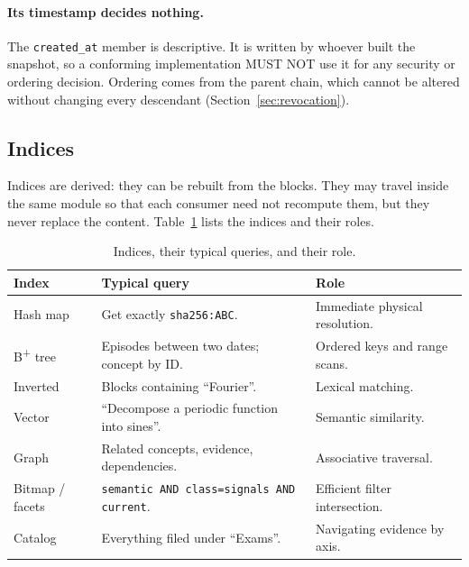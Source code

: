 \documentclass[11pt,a4paper]{article}
\begin{document}
\paragraph{Its timestamp decides nothing.}
The \texttt{created\_at} member is descriptive. It is written by whoever built
the snapshot, so a conforming implementation MUST NOT use it for any security or
ordering decision. Ordering comes from the parent chain, which cannot be altered
without changing every descendant (Section~\ref{sec:revocation}).

\subsection{Indices}
\label{sec:indices-derived}

Indices are derived: they can be rebuilt from the blocks. They may travel
inside the same module so that each consumer need not recompute them, but they
never replace the content. Table~\ref{tab:indices} lists the indices and their
roles.

\begin{table}[htbp]
\centering
\caption{Indices, their typical queries, and their role.}
\label{tab:indices}
\begin{tabularx}{\textwidth}{lXl}
\toprule
\textbf{Index} & \textbf{Typical query} & \textbf{Role} \\
\midrule
Hash map                   & Get exactly \texttt{sha256:ABC}.               & Immediate physical resolution. \\
B\textsuperscript{+} tree  & Episodes between two dates; concept by ID.     & Ordered keys and range scans. \\
Inverted                   & Blocks containing ``Fourier''.                 & Lexical matching. \\
Vector                     & ``Decompose a periodic function into sines''.  & Semantic similarity. \\
Graph                      & Related concepts, evidence, dependencies.      & Associative traversal. \\
Bitmap / facets & \texttt{semantic AND class=signals AND current}. & Efficient filter intersection. \\
Catalog                    & Everything filed under ``Exams''.              & Navigating evidence by axis. \\
\bottomrule
\end{tabularx}
\end{table}
\end{document}

